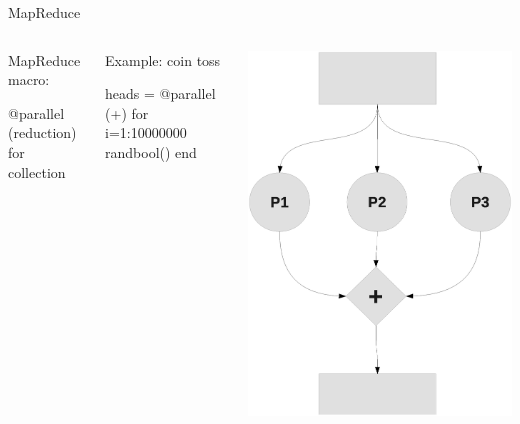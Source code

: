 \documentclass{beamer}
\begin{document}
	\begin{frame}[fragile]{MapReduce}
		\begin{columns}
		\begin{block}{MapReduce macro:}
			\begin{semiverbatim}
				@parallel (reduction) for collection
			\end{semiverbatim}
		\end{block}
		\begin{block}{Example: coin toss}	
		\begin{semiverbatim}
		heads = 
		@parallel (+) for i=1:10000000
		  randbool()
		end
		\end{semiverbatim}
		\end{block}
		\includegraphics[width = \textwidth]{figures/parallel_map.eps}
		\end{columns}
	\end{frame}
\end{document}
